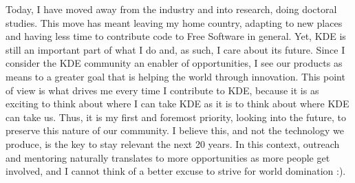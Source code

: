 \par
Today, I have moved away from the industry and into research, doing
doctoral studies. This move has meant leaving my home country,
adapting to new places and having less time to contribute code to Free
Software in general. Yet, KDE is still an important part of what I do
and, as such, I care about its future. Since I consider the KDE
community an enabler of opportunities, I see our products as means to
a greater goal that is helping the world through innovation. This
point of view is what drives me every time I contribute to KDE,
because it is as exciting to think about where I can take KDE as it is
to think about where KDE can take us. Thus, it is my first and
foremost priority, looking into the future, to preserve this nature of
our community. I believe this, and not the technology we produce, is
the key to stay relevant the next 20 years. In this context, outreach
and mentoring naturally translates to more opportunities as more
people get involved, and I cannot think of a better excuse to strive
for world domination :).
